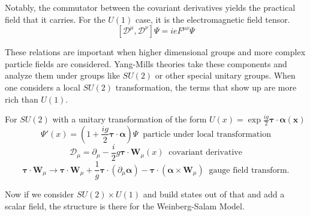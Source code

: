 Notably, the commutator between the covariant derivatives yields the practical field that it carries. For the $U(1) $ case, it is the electromagnetic field tensor. 
\begin{equation}  \left[ \mathcal{D}^\mu,\mathcal{D}^\nu\right] \Psi = ie F^{\mu\nu} \Psi\end{equation}

These relations are important when higher dimensional groups and more complex particle fields are considered. Yang-Mills theories take these components and analyze them under groups like $SU(2)$ or other special unitary groups. When one considers a local $SU(2)$ transformation, the terms that show up are more rich than $U(1)$.  

For $SU(2)$ with a unitary transformation of the form $U(x) = \exp{\frac{ig}{2}\bm{\tau}\cdot\bm{\alpha(x)}}$ 
\begin{equation}\Psi'(x)= (1 + \frac{ig}{2}\bm{\tau}\cdot\bm{\alpha})\Psi \;\;\text{particle under local transformation}\end{equation}
\begin{equation}\mathcal{D}_\mu = \partial_\mu -\frac{i}{2} g \bm{\tau}\cdot \bm{W}_\mu(x) \;\;\text{covariant derivative}\end{equation}
\begin{equation}\bm{\tau}\cdot\bm{W}_\mu \rightarrow  \bm{\tau}\cdot\bm{W}_\mu + \frac{1}{g}\bm{\tau}\cdot(\partial_\mu \bm{\alpha}) - \bm{\tau}\cdot (\bm{\alpha}\times\bm{W}_\mu) \;\;\text{gauge field transform.} \end{equation}


%

Now if we consider $SU(2)\times U(1)$ and build states out of that and add a scalar field, the structure is there for the Weinberg-Salam Model. 

